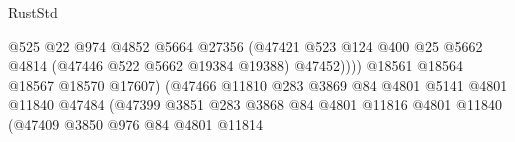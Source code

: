 \begin{lexlean}{RustStd}
\begin{coremodule}
                                                      @525
                                                      @22
                                                      @974
                                                      @4852
                                                      @5664
                                                      @27356
                                                      (@47421
                                                        @523
                                                        @124
                                                        @400
                                                        @25
                                                        @5662
                                                        @4814
                                                        (@47446 @522 @5662 @19384 @19388)
                                                        @47452))))
                                                @18561
                                                @18564
                                                @18567
                                                @18570
                                                @17607)
                                              (@47466
                                                @11810
                                                @283
                                                @3869
                                                @84
                                                @4801
                                                @5141
                                                @4801
                                                @11840
                                                @47484
                                                (@47399
                                                  @3851
                                                  @283
                                                  @3868
                                                  @84
                                                  @4801
                                                  @11816
                                                  @4801
                                                  @11840
                                                  (@47409
                                                    @3850
                                                    @976
                                                    @84
                                                    @4801
                                                    @11814

\end{coremodule}
\end{lexlean}
